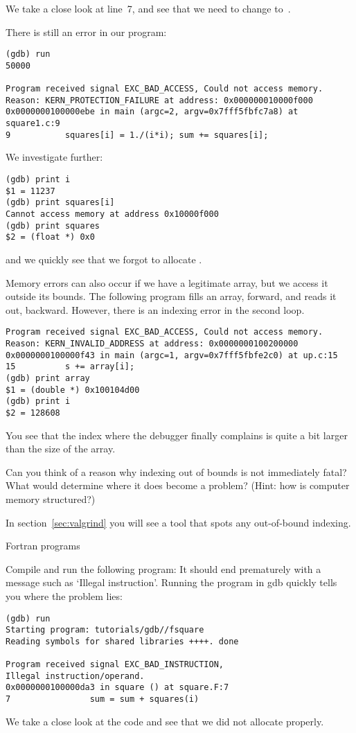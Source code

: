 We take a close look at line~7, and see that we need to
change  to~.

There is still an error in our program:
{\small
\begin{verbatim}
(gdb) run
50000

Program received signal EXC_BAD_ACCESS, Could not access memory.
Reason: KERN_PROTECTION_FAILURE at address: 0x000000010000f000
0x0000000100000ebe in main (argc=2, argv=0x7fff5fbfc7a8) at square1.c:9
9           squares[i] = 1./(i*i); sum += squares[i];
\end{verbatim}
}
We investigate further:
\begin{verbatim}
(gdb) print i
$1 = 11237
(gdb) print squares[i]
Cannot access memory at address 0x10000f000
(gdb) print squares
$2 = (float *) 0x0
\end{verbatim}
and we quickly see that we forgot to allocate .

Memory errors can also occur if we have a legitimate array, but we access it
outside its bounds.
The following program fills an array, forward, and reads it out, backward.
However, there is an indexing error in the second loop.
\begin{verbatim}
Program received signal EXC_BAD_ACCESS, Could not access memory.
Reason: KERN_INVALID_ADDRESS at address: 0x0000000100200000
0x0000000100000f43 in main (argc=1, argv=0x7fff5fbfe2c0) at up.c:15
15          s += array[i];
(gdb) print array
$1 = (double *) 0x100104d00
(gdb) print i
$2 = 128608
\end{verbatim}
You see that the index where the debugger finally complains
is quite a bit larger than the size of the array.
\begin{exercise}
  Can you think of a reason why indexing out of bounds is not immediately fatal?
  What would determine where it does become a problem?
  (Hint: how is computer memory structured?)
\end{exercise}

In section~\ref{sec:valgrind} you will see a tool
that spots any out-of-bound indexing.

 {Fortran programs}

Compile and run the following program:
It should end prematurely with a message such as `Illegal instruction'.
Running the program in gdb quickly tells you where the problem lies:
\begin{verbatim}
(gdb) run
Starting program: tutorials/gdb//fsquare 
Reading symbols for shared libraries ++++. done

Program received signal EXC_BAD_INSTRUCTION,
Illegal instruction/operand.
0x0000000100000da3 in square () at square.F:7
7                sum = sum + squares(i)
\end{verbatim}
We take a close look at the code and see that we did not allocate
 properly.

